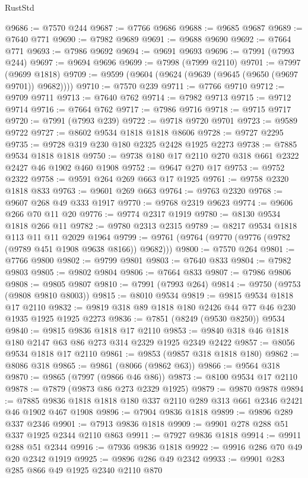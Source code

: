 \begin{lexlean}{RustStd}
\begin{coremodule}
@9686 := @7570 @244
@9687 := @7766 @9686
@9688 := @9685 @9687
@9689 := @7640 @771
@9690 := @7982 @9689
@9691 := @9688 @9690
@9692 := @7664 @771
@9693 := @7986 @9692
@9694 := @9691 @9693
@9696 := @7991 (@7993 @244)
@9697 := @9694 @9696
@9699 := @7998 (@7999 @2110)
@9701 := @7997 (@9699 @1818)
@9709 := @9599 (@9604 (@9624 (@9639 (@9645 (@9650 (@9697 @9701)) @9682))))
@9710 := @7570 @239
@9711 := @7766 @9710
@9712 := @9709 @9711
@9713 := @7640 @762
@9714 := @7982 @9713
@9715 := @9712 @9714
@9716 := @7664 @762
@9717 := @7986 @9716
@9718 := @9715 @9717
@9720 := @7991 (@7993 @239)
@9722 := @9718 @9720 @9701
@9723 := @9589 @9722
@9727 := @8602 @9534 @1818 @1818 @8606
@9728 := @9727 @2295
@9735 := @9728 @319 @230 @180 @2325 @2428 @1925 @2273
@9738 := @7885 @9534 @1818 @1818
@9750 := @9738 @180 @17 @2110 @270 @318 @661 @2322 @2427 @46 @1902 @460 @1908
@9752 := @9647 @270 @17
@9753 := @9752 @2322
@9758 := @9591 @264 @269 @663 @17 @1925
@9761 := @9758 @2320 @1818 @833
@9763 := @9601 @269 @663
@9764 := @9763 @2320
@9768 := @9607 @268 @49 @333 @1917
@9770 := @9768 @2319 @9623
@9774 := @9606 @266 @70 @11 @20
@9776 := @9774 @2317 @1919
@9780 := @8130 @9534 @1818 @266 @11
@9782 := @9780 @2313 @2315
@9789 := @8217 @9534 @1818 @113 @11 @11 @2029 @1964
@9799 := @9761 (@9764 (@9770 (@9776 (@9782 (@9789 @451 @1908 @9638 @8166)) @9682)))
@9800 := @7570 @264
@9801 := @7766 @9800
@9802 := @9799 @9801
@9803 := @7640 @833
@9804 := @7982 @9803
@9805 := @9802 @9804
@9806 := @7664 @833
@9807 := @7986 @9806
@9808 := @9805 @9807
@9810 := @7991 (@7993 @264)
@9814 := @9750 (@9753 (@9808 @9810 @8003))
@9815 := @8010 @9534
@9819 := @9815 @9534 @1818 @17 @2110
@9832 := @9819 @318 @89 @1818 @180 @2426 @44 @77 @46 @230 @1935 @1925 @1925 @2273
@9836 := @7851 (@8249 (@9530 @8250)) @9534
@9840 := @9815 @9836 @1818 @17 @2110
@9853 := @9840 @318 @46 @1818 @180 @2147 @63 @86 @273 @314 @2329 @1925 @2349 @2422
@9857 := @8056 @9534 @1818 @17 @2110
@9861 := @9853 (@9857 @318 @1818 @180)
@9862 := @8086 @318
@9865 := @9861 (@8066 (@9862 @63))
@9866 := @9564 @318
@9870 := @9865 (@7997 (@9866 @46 @86))
@9873 := @8100 @9534 @17 @2110
@9878 := @7879 (@9873 @86 @273 @2329 @1925)
@9879 := @9870 @9878
@9894 := @7885 @9836 @1818 @1818 @180 @337 @2110 @289 @313 @661 @2346 @2421 @46 @1902 @467 @1908
@9896 := @7904 @9836 @1818
@9899 := @9896 @289 @337 @2346
@9901 := @7913 @9836 @1818
@9909 := @9901 @278 @288 @51 @337 @1925 @2344 @2110 @863
@9911 := @7927 @9836 @1818
@9914 := @9911 @288 @51 @2344
@9916 := @7936 @9836 @1818
@9922 := @9916 @286 @70 @49 @20 @2342 @1919
@9925 := @9896 @286 @49 @2342
@9933 := @9901 @283 @285 @866 @49 @1925 @2340 @2110 @870

\end{coremodule}
\end{lexlean}
